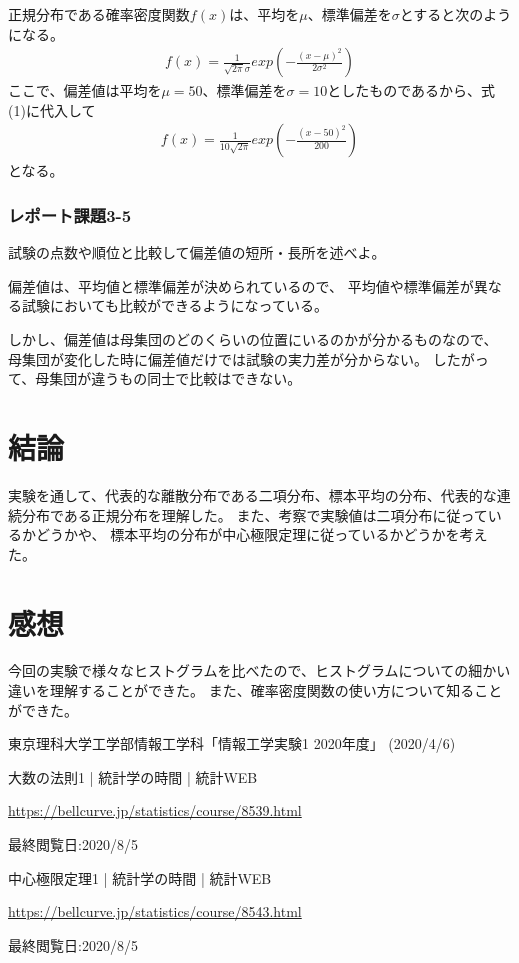 \documentclass[12pt]{jarticle}
\begin{document}
正規分布である確率密度関数$f(x)$は、平均を$\mu$、標準偏差を$\sigma$とすると次のようになる。
\begin{eqnarray}
    f(x)=\frac{1}{\sqrt{2\pi}\sigma}exp\left(-\frac{(x-\mu)^2}{2\sigma^2}\right)
\end{eqnarray}
ここで、偏差値は平均を$\mu=50$、標準偏差を$\sigma=10$としたものであるから、式(1)に代入して
\begin{eqnarray*}
    f(x)=\frac{1}{10\sqrt{2\pi}}exp\left(-\frac{(x-50)^2}{200}\right)
\end{eqnarray*}
となる。

\clearpage
\subsubsection*{レポート課題3-5}
\begin{shadebox}
    試験の点数や順位と比較して偏差値の短所・長所を述べよ。
\end{shadebox}
偏差値は、平均値と標準偏差が決められているので、
平均値や標準偏差が異なる試験においても比較ができるようになっている。

しかし、偏差値は母集団のどのくらいの位置にいるのかが分かるものなので、
母集団が変化した時に偏差値だけでは試験の実力差が分からない。
したがって、母集団が違うもの同士で比較はできない。

\section{結論}
実験を通して、代表的な離散分布である二項分布、標本平均の分布、代表的な連続分布である正規分布を理解した。
また、考察で実験値は二項分布に従っているかどうかや、
標本平均の分布が中心極限定理に従っているかどうかを考えた。

\section{感想}
今回の実験で様々なヒストグラムを比べたので、ヒストグラムについての細かい違いを理解することができた。
また、確率密度関数の使い方について知ることができた。

\clearpage
\begin{thebibliography}{99}
    \label{sannkoubunnkenn_chapter}
    東京理科大学工学部情報工学科「情報工学実験1 2020年度」
    (2020/4/6)

    大数の法則1 | 統計学の時間 | 統計WEB

    \url{https://bellcurve.jp/statistics/course/8539.html}

    最終閲覧日:2020/8/5

    中心極限定理1 | 統計学の時間 | 統計WEB

    \url{https://bellcurve.jp/statistics/course/8543.html}

    最終閲覧日:2020/8/5

\end{thebibliography}

\appendix
\end{document}
